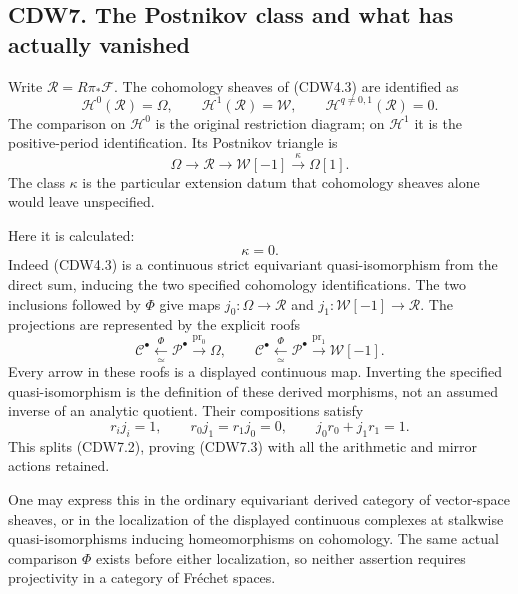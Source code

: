 \subsection{CDW7. The Postnikov class and what has actually
vanished}\label{cdw7.-the-postnikov-class-and-what-has-actually-vanished}

Write \(\mathscr R=R\pi_*\mathscr F\). The cohomology sheaves of
(CDW4.3) are identified as \[
\mathcal H^0(\mathscr R)=\Omega,\qquad
\mathcal H^1(\mathscr R)=\mathscr W,\qquad
\mathcal H^{q\ne0,1}(\mathscr R)=0.
\tag{CDW7.1}
\] The comparison on \(\mathcal H^0\) is the original restriction
diagram; on \(\mathcal H^1\) it is the positive-period identification.
Its Postnikov triangle is \[
\Omega\longrightarrow\mathscr R\longrightarrow
\mathscr W[-1]\xrightarrow{\ \kappa\ }\Omega[1].
\tag{CDW7.2}
\] The class \(\kappa\) is the particular extension datum that
cohomology sheaves alone would leave unspecified.

Here it is calculated: \[
\boxed{\kappa=0.}
\tag{CDW7.3}
\] Indeed (CDW4.3) is a continuous strict equivariant quasi-isomorphism
from the direct sum, inducing the two specified cohomology
identifications. The two inclusions followed by \(\Phi\) give maps
\(j_0:\Omega\to\mathscr R\) and \(j_1:\mathscr W[-1]\to\mathscr R\). The
projections are represented by the explicit roofs \[
\mathscr C^\bullet
\xleftarrow[\simeq]{\,\Phi\,}
\mathscr P^\bullet
\xrightarrow{\operatorname{pr}_0}\Omega,
\qquad
\mathscr C^\bullet
\xleftarrow[\simeq]{\,\Phi\,}
\mathscr P^\bullet
\xrightarrow{\operatorname{pr}_1}\mathscr W[-1].
\tag{CDW7.4}
\] Every arrow in these roofs is a displayed continuous map. Inverting
the specified quasi-isomorphism is the definition of these derived
morphisms, not an assumed inverse of an analytic quotient. Their
compositions satisfy \[
r_i j_i=1,\qquad r_0j_1=r_1j_0=0,\qquad
j_0r_0+j_1r_1=1.
\tag{CDW7.5}
\] This splits (CDW7.2), proving (CDW7.3) with all the arithmetic and
mirror actions retained.

One may express this in the ordinary equivariant derived category of
vector-space sheaves, or in the localization of the displayed continuous
complexes at stalkwise quasi-isomorphisms inducing homeomorphisms on
cohomology. The same actual comparison \(\Phi\) exists before either
localization, so neither assertion requires projectivity in a category
of Fréchet spaces.

